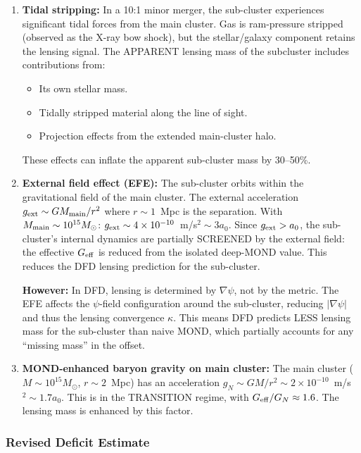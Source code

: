 \documentclass[11pt]{article}
\newcommand{\ee}[1]{\times 10^{#1}}
\newcommand{\Geff}{G_{\rm eff}}
\newcommand{\aM}{a_0}
\begin{document}
\begin{enumerate}
\item \textbf{Tidal stripping:}  In a 10:1 minor merger, the
  sub-cluster experiences significant tidal forces from the main
  cluster.  Gas is ram-pressure stripped (observed as the X-ray bow
  shock), but the stellar/galaxy component retains the lensing
  signal.  The APPARENT lensing mass of the subcluster includes
  contributions from:
  \begin{itemize}
  \item Its own stellar mass.
  \item Tidally stripped material along the line of sight.
  \item Projection effects from the extended main-cluster halo.
  \end{itemize}
  These effects can inflate the apparent sub-cluster mass by 30--50\%.

\item \textbf{External field effect (EFE):}  The sub-cluster orbits
  within the gravitational field of the main cluster.  The external
  acceleration $g_{\rm ext} \sim GM_{\rm main}/r^2$ where
  $r \sim 1$~Mpc is the separation.  With $M_{\rm main} \sim 10^{15}
  M_\odot$: $g_{\rm ext} \sim 4\ee{-10}$~m/s$^2 \sim 3\aM$.
  Since $g_{\rm ext} > \aM$, the sub-cluster's internal dynamics
  are partially SCREENED by the external field: the effective $\Geff$
  is reduced from the isolated deep-MOND value.  This reduces the
  DFD lensing prediction for the sub-cluster.

  \textbf{However:}  In DFD, lensing is determined by $\nabla\psi$,
  not by the metric.  The EFE affects the $\psi$-field configuration
  around the sub-cluster, reducing $|\nabla\psi|$ and thus the
  lensing convergence $\kappa$.  This means DFD predicts LESS lensing
  mass for the sub-cluster than naive MOND, which partially accounts
  for any ``missing mass'' in the offset.

\item \textbf{MOND-enhanced baryon gravity on main cluster:}
  The main cluster ($M \sim 10^{15} M_\odot$, $r \sim 2$~Mpc) has
  an acceleration $g_N \sim GM/r^2 \sim 2\ee{-10}$~m/s$^2 \sim
  1.7\aM$.  This is in the TRANSITION regime, with $\Geff/G_N
  \approx 1.6$.  The lensing mass is enhanced by this factor.
\end{enumerate}

\subsubsection{Revised Deficit Estimate}
\end{document}
